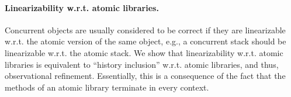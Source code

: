 
\paragraph{Linearizability w.r.t. atomic libraries.}
Concurrent objects are usually considered to be
correct if they are linearizable w.r.t. the atomic version of the same object, 
e.g., a concurrent stack should be linearizable w.r.t. the
atomic stack. 
%
%
%
%
%
%
%
%
%
We show that linearizability w.r.t. atomic libraries is equivalent to ``history inclusion'' w.r.t. atomic libraries,
and thus, observational refinement. Essentially, this is a consequence of the fact that the methods
of an atomic library terminate in every context.

